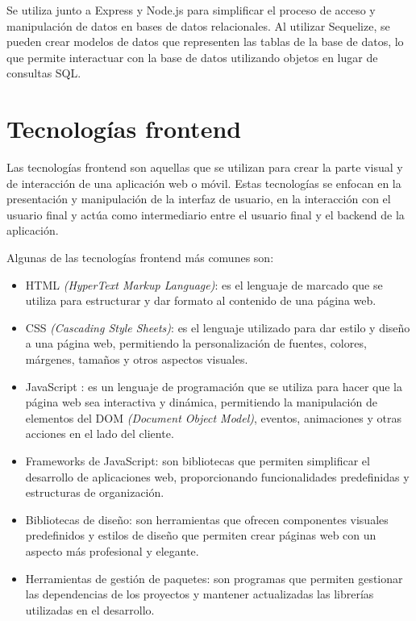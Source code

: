 Se utiliza junto a Express y Node.js para simplificar el proceso de acceso y manipulación de datos en bases de datos relacionales. Al utilizar Sequelize, se pueden crear modelos de datos que representen las tablas de la base de datos, lo que permite interactuar con la base de datos utilizando objetos en lugar de consultas SQL.

\section{Tecnologías frontend}
\label{sec:frontend}

Las tecnologías frontend son aquellas que se utilizan para crear la parte visual y de interacción de una aplicación web o móvil. Estas tecnologías se enfocan en la presentación y manipulación de la interfaz de usuario, en la interacción con el usuario final y actúa como intermediario entre el usuario final y el backend de la aplicación.

Algunas de las tecnologías frontend más comunes son:
\begin{itemize}
	\item HTML \cite{WEBSITE:HTML} \textit{(HyperText Markup Language)}: es el lenguaje de marcado que se utiliza para estructurar y dar formato al contenido de una página web.
	\item CSS \cite{WEBSITE:css} \textit{(Cascading Style Sheets)}: es el lenguaje utilizado para dar estilo y diseño a una página web, permitiendo la personalización de fuentes, colores, márgenes, tamaños y otros aspectos visuales.
	\item JavaScript \cite{WEBSITE:javascript}: es un lenguaje de programación que se utiliza para hacer que la página web sea interactiva y dinámica, permitiendo la manipulación de elementos del DOM \cite{WEBSITE:DOM} \textit{(Document Object Model)}, eventos, animaciones y otras acciones en el lado del cliente.
	\item Frameworks de JavaScript: son bibliotecas que permiten simplificar el desarrollo de aplicaciones web, proporcionando funcionalidades predefinidas y estructuras de organización.
	\item Bibliotecas de diseño: son herramientas que ofrecen componentes visuales predefinidos y estilos de diseño que permiten crear páginas web con un aspecto más profesional y elegante.
	\item Herramientas de gestión de paquetes: son programas que permiten gestionar las dependencias de los proyectos y mantener actualizadas las librerías utilizadas en el desarrollo.	
\end{itemize}

